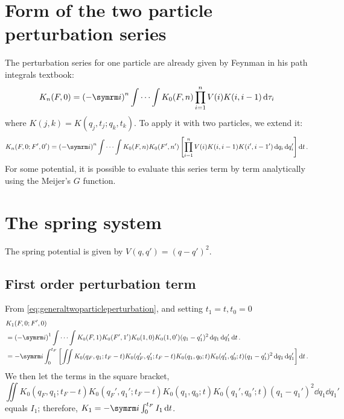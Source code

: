 \section{Form of the two particle perturbation series}

The perturbation series for one particle are already given by Feynman in his path integrals textbook:
\begin{equation}
    K_n(F, 0) = \left(-\im\right)^n\idotsint K_0(F, n)\prod_{i = 1}^n V(i)K(i, i - 1)\dd{\tau_i}
\end{equation}
where $K(j, k) = K(q_j, t_j; q_k, t_k)$. To apply it with two particles, we extend it:
\begin{equation}
    K_n(F, 0; F', 0') = \left(-\im\right)^n\idotsint K_0(F, n)K_0(F', n')\left[\prod_{i = 1}^nV(i)K(i, i - 1)K(i', i - 1')\dd{q_i}\dd{q_i'}\right]\dd{t}. \label{eq:generaltwoparticleperturbation}
\end{equation}
For some potential, it is possible to evaluate this series term by term analytically using the Meijer's $G$ function.

\section{The spring system}

The spring potential is given by $V(q, q') = (q - q')^2.$

\subsection{First order perturbation term}

From \cref{eq:generaltwoparticleperturbation}, and setting $t_1 = t, t_0 = 0$
\begin{align}
    &K_1(F, 0; F', 0) \nonumber \\
    &= \left(-\im\right)^1\idotsint K_0(F, 1)K_0(F', 1')K_0(1, 0)K_0(1, 0')(q_1 - q_1')^2\dd{q_1}\dd{q_1'}\dd{t}. \\
    &= -\im\int_0^{t_F}\left[\iint K_0(q_F, q_1; t_F - t)K_0(q_F', q_1'; t_F - t)K_0(q_1, q_0; t)K_0(q_1', q_0'; t)(q_1 - q_1')^2\dd{q_1}\dd{q_1'}\right]\dd{t}. \nonumber
\end{align}
We then let the terms in the square bracket,
\begin{equation}
    \iint K_0(q_F, q_1; t_F - t)K_0(q_F', q_1'; t_F - t)K_0(q_1, q_0; t)K_0(q_1', q_0'; t)(q_1 - q_1')^2\dd{q_1}\dd{q_1'}
\end{equation}
equals $I_1$; therefore, $K_1 = -\im\int_0^{t_F} I_1\dd{t}$.

